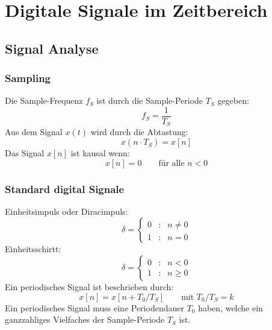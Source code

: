 



\chapter{Digitale Signale im Zeitbereich}
\section{Signal Analyse}
\subsection{Sampling}
Die Sample-Frequenz $f_S$ ist durch die Sample-Periode
$T_S$ gegeben:
\[ f_S = \frac{1}{T_S} \]
Aus dem Signal $x(t)$ wird durch die Abtastung:
\[ x(n\cdot T_S) = x[n]\]
Das Signal $x[n]$ ist kausal wenn:
\[ x[n] = 0 \qquad \textrm{für alle } n < 0 \]

\subsection{Standard digital Signale}
Einheitsimpuls oder Diracimpuls:
\[
	\delta = \left\lbrace \begin{matrix}
		0 & : & n \neq 0 \\
		1 & : & n = 0
	\end{matrix} \right.
\]
Einheitsschirtt:
\[
	\delta = \left\lbrace \begin{matrix}
		0 & : & n < 0 \\
		1 & : & n \geq 0
	\end{matrix} \right.
\]
Ein periodisches Signal ist beschrieben durch:
\[ x[n] = x[n + T_0/T_S] \qquad \textrm{mit } T_0/T_S = k \]
Ein periodisches Signal muss eine Periodendauer $T_0$ haben,
welche ein ganzzahliges Vielfaches der Sample-Periode $T_S$ ist. 

